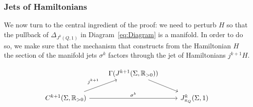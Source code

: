 \documentclass{amsart}
\newcommand{\RR}{\mathbb{R}}
\theoremstyle{definition}
\theoremstyle{remark}
\numberwithin{equation}{section}
\begin{document}



\subsubsection{Jets of Hamiltonians} 
We now turn to the central ingredient of the proof: we need to perturb $H$ so that the pullback of $\Delta_{J^k(Q,1)}$ in Diagram~\ref{eq:Diagram} is a manifold. In order to do so, we make sure that the mechanism that constructs from the Hamiltonian $H$ the section of the manifold jets $\sigma^k$ factors through the jet of Hamiltonians $j^{k+1}H$. 

\[
  \begin{tikzcd}
    & \Gamma(J^{k+1}(\Sigma,\RR_{>0}))\arrow{dr} &  \\ 
    C^{k+1}(\Sigma,\RR_{>0}) \arrow{ur}{j^{k+1}}\arrow{rr}{\sigma^k} & & J^k_{\pi_Q}(\Sigma,1)
  \end{tikzcd}
\]
\end{document}
